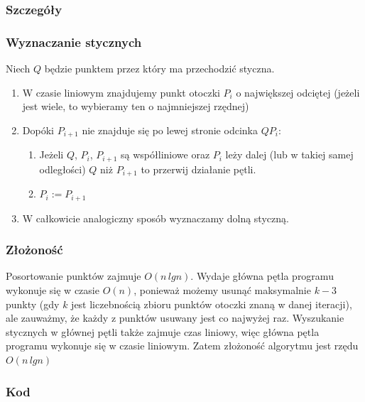 \documentclass[11pt]{article}
\theoremstyle{remark} \newtheorem{definition}{def.}
\theoremstyle{definition} \newtheorem{twierdzenie}{tw.}
\begin{document}
    \subsubsection{Szczegóły}
        \subsubsection*{Wyznaczanie stycznych}
        Niech $Q$ będzie punktem przez który ma przechodzić styczna. 

        \begin{enumerate}
            \item   W czasie liniowym znajdujemy punkt otoczki $P_i$ o największej odciętej (jeżeli jest wiele, to wybieramy ten o najmniejszej rzędnej)
            \item   Dopóki $P_{i+1}$ nie znajduje się po lewej stronie odcinka $QP_i$:
                    \begin{enumerate}
                        \item   Jeżeli $Q$, $P_i$, $P_{i+1}$ są współliniowe oraz $P_i$ leży dalej (lub w takiej samej odległości) $Q$ niż $P_{i+1}$ to przerwij działanie pętli.
                        \item   $P_i := P_{i+1}$ 
                    \end{enumerate}
            \item   W całkowicie analogiczny sposób wyznaczamy dolną styczną. 
        \end{enumerate}
       
    \subsubsection{Złożoność}
        Posortowanie punktów zajmuje $O(n \, lgn)$. Wydaje główna pętla programu wykonuje się w czasie $O(n)$, ponieważ możemy usunąć maksymalnie $k-3$ punkty (gdy $k$ jest liczebnością 
        zbioru punktów otoczki znaną w danej iteracji), ale zauważmy, że każdy z punktów usuwany jest co najwyżej raz. Wyszukanie stycznych w głównej pętli także zajmuje 
        czas liniowy, więc główna pętla programu wykonuje się w czasie liniowym. Zatem złożoność algorytmu jest rzędu $O(n \, lgn)$\\

    \subsubsection{Kod}
\end{document}

